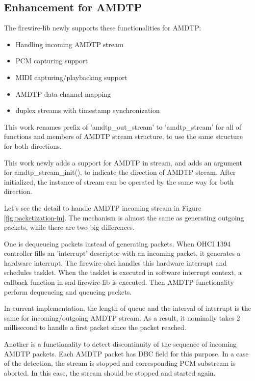 \documentclass[onecolumn]{article}
\begin{document}
\subsection{Enhancement for AMDTP}

The firewire-lib newly supports these functionalities for AMDTP:

\begin{itemize}
	\item Handling incoming AMDTP stream
	\item PCM capturing support
	\item MIDI capturing/playbacking support
	\item AMDTP data channel mapping
	\item duplex streams with timestamp synchronization
\end{itemize}

This work renames prefix of 'amdtp\_out\_stream' to 'amdtp\_stream' for all of functions and members of AMDTP stream structure, to use the same structure for both directions.

This work newly adds a support for AMDTP in stream, and adds an argument for amdtp\_stream\_init(), to indicate the direction of AMDTP stream. After initialized, the instance of stream can be operated by the same way for both direction.

Let's see the detail to handle AMDTP incoming stream in Figure \ref{fig:packetization-in}. The mechanism is almost the same as generating outgoing packets, while there are two big differences.

One is dequeueing packets instead of generating packets. When OHCI 1394 controller fills an 'interrupt' descriptor with an incoming packet, it generates a hardware interrupt. The firewire-ohci handles this hardware interrupt and schedules tasklet. When the tasklet is executed in software interrupt context, a callback function in snd-firewire-lib is executed. Then AMDTP functionality perform dequeueing and queueing packets.

In current implementation, the length of queue and the interval of interrupt is the same for incoming/outgoing AMDTP stream. As a result, it nominally takes 2 millisecond to handle a first packet since the packet reached.

Another is a functionality to detect discontinuity of the sequence of incoming AMDTP packets. Each AMDTP packet has DBC field for this purpose. In a case of the detection, the stream is stopped and corresponding PCM substream is aborted. In this case, the stream should be stopped and started again.
\end{document}
